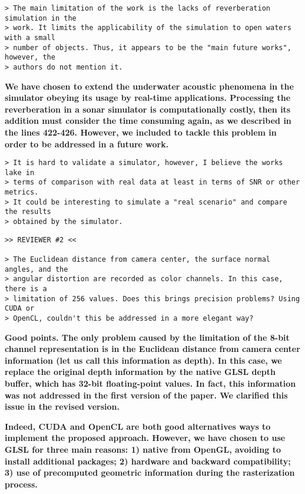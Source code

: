 \documentclass{article}
\begin{document}
\begin{verbatim}
> The main limitation of the work is the lacks of reverberation simulation in the
> work. It limits the applicability of the simulation to open waters with a small
> number of objects. Thus, it appears to be the "main future works", however, the
> authors do not mention it.
\end{verbatim}

\textbf{We have chosen to extend the underwater acoustic phenomena in the
simulator obeying its usage by real-time applications. Processing the
reverberation in a sonar simulator is computationally costly, then its
addition must consider the time consuming again, as we described in the
lines 422-426. However, we included to tackle this problem in order to be 
addressed in a future work.}

\begin{verbatim}
> It is hard to validate a simulator, however, I believe the works lake in
> terms of comparison with real data at least in terms of SNR or other metrics.
> It could be interesting to simulate a "real scenario" and compare the results
> obtained by the simulator.
\end{verbatim}


\begin{verbatim}
>> REVIEWER #2 <<

> The Euclidean distance from camera center, the surface normal angles, and the
> angular distortion are recorded as color channels. In this case, there is a
> limitation of 256 values. Does this brings precision problems? Using CUDA or
> OpenCL, couldn't this be addressed in a more elegant way?
\end{verbatim}


\textbf{Good points. The only problem caused by the limitation of the 8-bit channel 
representation is in the Euclidean distance from camera center information (let us call 
this information as depth). In this case, we replace the original depth information by
the native GLSL depth buffer, which has 32-bit floating-point values. In fact, this 
information was not addressed in the first version of the paper. We clarified this issue
in the revised version. }

\textbf{Indeed, CUDA and OpenCL are both good alternatives ways to implement
the proposed approach. However, we have chosen to use GLSL for three main reasons:
1) native from OpenGL, avoiding to install additional packages;
2) hardware and backward compatibility;
3) use of precomputed geometric information during the rasterization process.}
\end{document}
